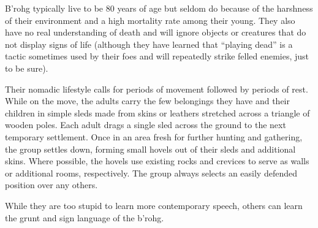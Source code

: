 B'rohg typically live to be 80 years of age but seldom do because of the harshness of their environment and a high mortality rate among their young. They also have no real understanding of death and will ignore objects or creatures that do not display signs of life (although they have learned that ``playing dead'' is a tactic sometimes used by their foes and will repeatedly strike felled enemies, just to be sure).

Their nomadic lifestyle calls for periods of movement followed by periods of rest. While on the move, the adults carry the few belongings they have and their children in simple sleds made from skins or leathers stretched across a triangle of wooden poles. Each adult drags a single sled across the ground to the next temporary settlement. Once in an area fresh for further hunting and gathering, the group settles down, forming small hovels out of their sleds and additional skins. Where possible, the hovels use existing rocks and crevices to serve as walls or additional rooms, respectively. The group always selects an easily defended position over any others.

While they are too stupid to learn more contemporary speech, others can learn the grunt and sign language of the b'rohg.

